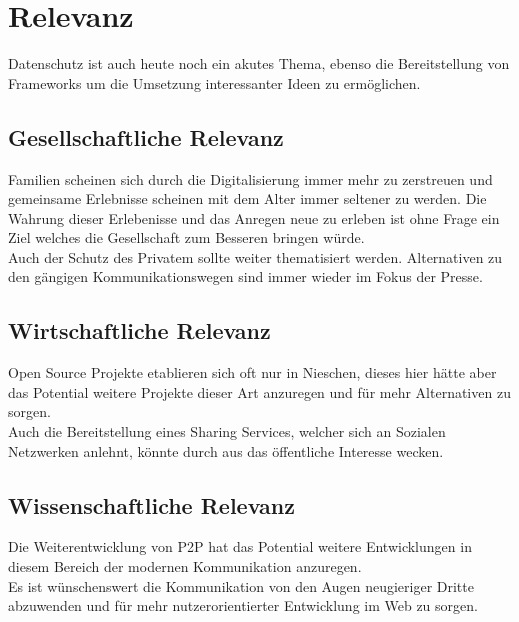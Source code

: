 \documentclass[10pt]{article}
\begin{document}
    \section{Relevanz}\label{sec:Relevanz}
    Datenschutz ist auch heute noch ein akutes Thema, ebenso die Bereitstellung von Frameworks um die Umsetzung interessanter Ideen zu ermöglichen.
        \subsection{Gesellschaftliche Relevanz}\label{sec:Gesellschaftliche}
        Familien scheinen sich durch die Digitalisierung immer mehr zu zerstreuen und gemeinsame Erlebnisse scheinen mit dem Alter immer seltener zu werden. Die Wahrung dieser Erlebenisse und das Anregen neue zu erleben ist ohne Frage ein Ziel welches die Gesellschaft zum Besseren bringen würde.\\
        Auch der Schutz des Privatem sollte weiter thematisiert werden. Alternativen zu den gängigen Kommunikationswegen sind immer wieder im Fokus der Presse.

        \subsection{Wirtschaftliche Relevanz}\label{sec:Wirtschaftliche}
        Open Source Projekte etablieren sich oft nur in Nieschen, dieses hier hätte aber das Potential weitere Projekte dieser Art anzuregen und für mehr Alternativen zu sorgen. \\
        Auch die Bereitstellung eines Sharing Services, welcher sich an Sozialen Netzwerken anlehnt, könnte durch aus das öffentliche Interesse wecken.

        \subsection{Wissenschaftliche Relevanz}\label{sec:Wissenschaftliche}
        Die Weiterentwicklung von P2P hat das Potential weitere Entwicklungen in diesem Bereich der modernen Kommunikation anzuregen. \\
        Es ist wünschenswert die Kommunikation von den Augen neugieriger Dritte abzuwenden und für mehr nutzerorientierter Entwicklung im Web zu sorgen.
\end{document}
